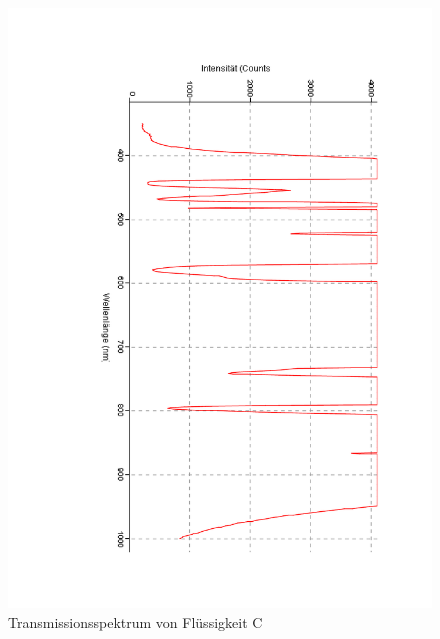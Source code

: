 \documentclass[12pt,a4paper]{article}
\begin{document}
\begin{figure}[H]
	\centering
	\includegraphics[scale=0.5,angle = 90,trim = 20mm 20mm 20mm 20mm]{./data/Spektro/Transmission_C_DO_4.pdf}
	\caption{Transmissionsspektrum von Flüssigkeit C}
	\label{fig:TransmissionC}
\end{figure}
\end{document}
